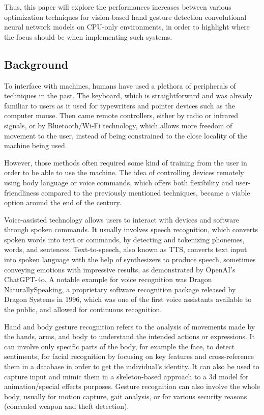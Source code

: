 \documentclass[12pt]{article}
\begin{document}
  Thus, this paper will explore the performances increases between various optimization techniques for vision-based hand gesture detection convolutional neural network models on CPU-only environments, in order to highlight where the focus should be when implementing such systems.  

  \subsection{Background}

  To interface with machines, humans have used a plethora of peripherals of techniques in the past. The keyboard, which is straightforward and was already familiar to users as it used for typewriters and pointer devices such as the computer mouse. Then came remote controllers, either by radio or infrared signals, or by Bluetooth/Wi-Fi technology, which allows more freedom of movement to the user, instead of being constrained to the close locality of the machine being used.

  However, those methods often required some kind of training from the user in order to be able to use the machine. The idea of controlling devices remotely using body language or voice commands, which offers both flexibility and user-friendliness compared to the previously mentioned techniques, became a viable option around the end of the century.

  Voice-assisted technology allows users to interact with devices and software through spoken commands. It usually involves speech recognition, which converts spoken words into text or commands, by detecting and tokenizing phonemes, words, and sentences. Text-to-speech, also known as TTS, converts text input into spoken language with the help of synthesizers to produce speech, sometimes conveying emotions with impressive results, as demonstrated by OpenAI's ChatGPT-4o. A notable example for voice recognition was Dragon NaturallySpeaking, a proprietary software recognition package released by Dragon Systems in 1996, which was one of the first voice assistants available to the public, and allowed for continuous recognition.

  Hand and body gesture recognition refers to the analysis of movements made by the hands, arms, and body to understand the intended actions or expressions. It can involve only specific parts of the body, for example the face, to detect sentiments, for facial recognition by focusing on key features and cross-reference them in a database in order to get the individual's identity. It can also be used to capture input and mimic them in a skeleton-based approach to a 3d model for animation/special effects purposes.
  Gesture recognition can also involve the whole body, usually for motion capture, gait analysis, or for various security reasons (concealed weapon and theft detection).
\end{document}
